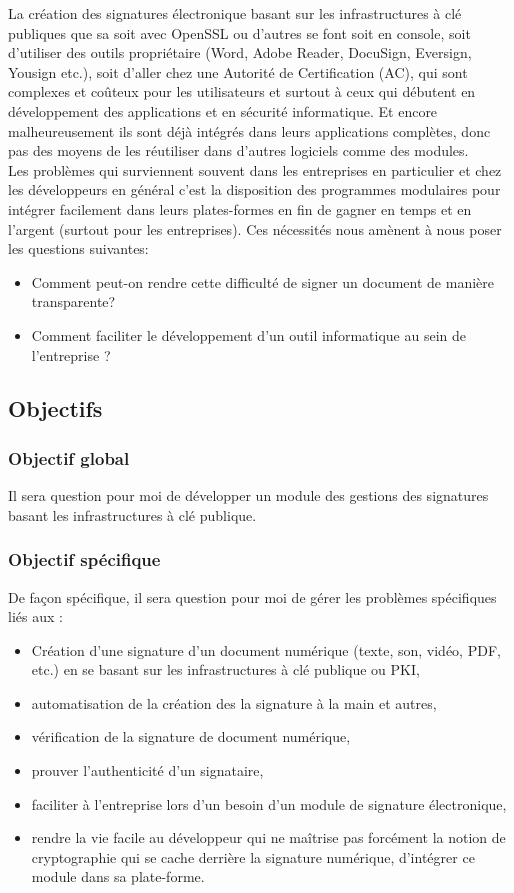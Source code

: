 \documentclass[12pt,a4paper]{article}
\begin{document}
		La création des signatures électronique basant sur les infrastructures à clé publiques que sa soit avec OpenSSL ou d'autres se font soit en console, soit d'utiliser des outils propriétaire (Word, Adobe Reader, DocuSign, Eversign, Yousign etc.), soit d'aller chez une Autorité de Certification (AC), qui sont complexes et coûteux pour les utilisateurs et surtout à ceux qui débutent en développement des applications et en sécurité informatique. Et encore malheureusement ils sont déjà intégrés dans leurs applications complètes, donc pas des moyens de les réutiliser dans  d'autres logiciels comme des modules.\\
		
		Les problèmes qui surviennent souvent dans les entreprises en particulier et chez les développeurs en général c'est la disposition des programmes modulaires pour intégrer facilement dans leurs plates-formes en fin de gagner en temps et en l'argent (surtout pour les entreprises). Ces nécessités nous amènent à nous poser les questions suivantes:
		
	\begin{itemize}
		\item Comment peut-on rendre cette difficulté de signer un document de manière transparente?
		\item Comment faciliter le développement d'un outil informatique au sein de l'entreprise ?
	\end{itemize}
	
	\subsection{Objectifs}
		\subsubsection{Objectif global}
			Il sera question pour moi de développer un module des gestions des signatures basant les infrastructures à clé publique.
		\subsubsection{Objectif spécifique}
			De façon spécifique, il sera question pour moi de gérer les problèmes spécifiques liés aux :
			\begin{itemize}
				\item Création d'une signature d'un document numérique (texte, son, vidéo, PDF, etc.) en se basant sur les infrastructures à clé publique ou PKI,
				\item automatisation de la création des la signature à la main et autres,
				\item vérification de la signature de document numérique,
				\item prouver l'authenticité d'un signataire,
				\item faciliter à l'entreprise lors d'un besoin d'un module de signature électronique,
				\item rendre la vie facile au développeur qui ne maîtrise pas forcément  la notion de cryptographie qui se cache derrière la signature numérique, d'intégrer ce module dans sa plate-forme.
			\end{itemize}
			
\end{document}
